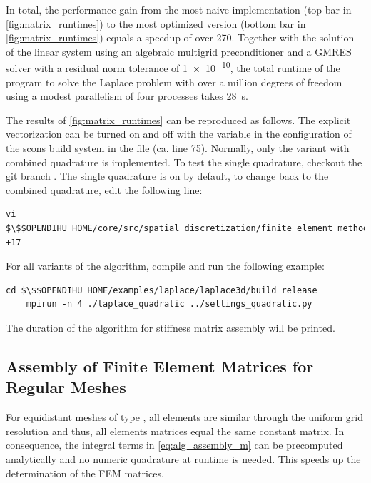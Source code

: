 In total, the performance gain from the most naive implementation (top bar in \cref{fig:matrix_runtimes}) to the most optimized version (bottom bar in \cref{fig:matrix_runtimes}) equals a speedup of over \num{270}. Together with the solution of the linear system using an algebraic multigrid preconditioner and a GMRES solver with a residual norm tolerance of \num{1e-10}, the total runtime of the program to solve the Laplace problem with over a million degrees of freedom using a modest parallelism of four processes takes \SI{28}{\second}.


\begin{reproduce_no_break}
  The results of \cref{fig:matrix_runtimes} can be reproduced as follows. The explicit vectorization can be turned on and off with the variable  in the configuration of the scons build system in the file  (ca. line 75). Normally, only the variant with combined quadrature is implemented. To test the single quadrature, checkout the git branch . The single quadrature is on by default, to change back to the combined quadrature, edit the following line:
  \begin{lstlisting}[columns=fullflexible,breaklines=true,postbreak=\mbox{\textcolor{gray}{$\hookrightarrow$}\space}]
    vi $\$$OPENDIHU_HOME/core/src/spatial_discretization/finite_element_method/01_stiffness_matrix_integrate.tpp +17
  \end{lstlisting}
  For all variants of the algorithm, compile and run the following example: 
  \begin{lstlisting}[columns=fullflexible,breaklines=true,postbreak=\mbox{\textcolor{gray}{$\hookrightarrow$}\space}]
    cd $\$$OPENDIHU_HOME/examples/laplace/laplace3d/build_release
    mpirun -n 4 ./laplace_quadratic ../settings_quadratic.py
  \end{lstlisting}
  The duration of the algorithm for stiffness matrix assembly will be printed.
\end{reproduce_no_break}

\subsection{Assembly of Finite Element Matrices for Regular Meshes}

For equidistant meshes of type , all elements are similar through the uniform grid resolution and thus, all elements matrices equal the same constant matrix. In consequence, the integral terms in \cref{eq:alg_assembly_m} can be precomputed analytically and no numeric quadrature at runtime is needed. This speeds up the determination of the FEM matrices.

